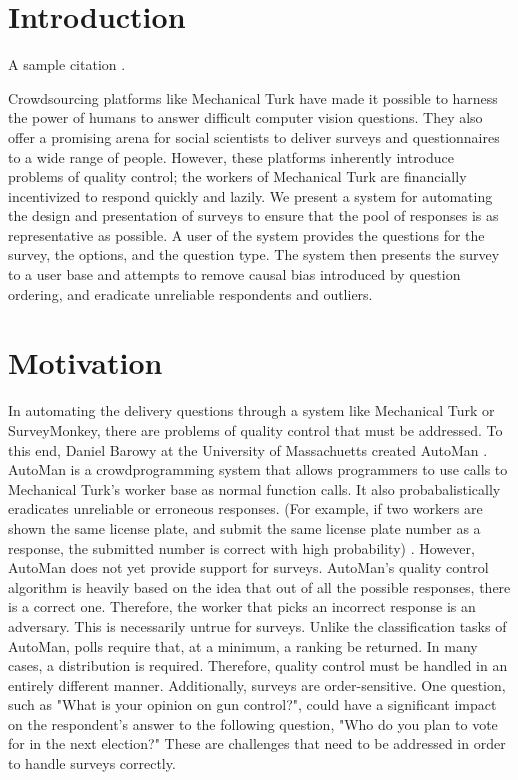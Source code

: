 \documentclass{article}
\begin{document}
\section{Introduction}
A sample citation \cite{dummyentry}.

Crowdsourcing platforms like Mechanical Turk have made it possible to harness the power of humans to answer difficult computer vision questions. They also offer a promising arena for social scientists to deliver surveys and questionnaires to a wide range of people. However, these platforms inherently introduce problems of quality control; the workers of Mechanical Turk are financially incentivized to respond quickly and lazily. We present a system for automating the design and presentation of surveys to ensure that the pool of responses is as representative as possible. A user of the system provides the questions for the survey, the options, and the question type. The system then presents the survey to a user base and attempts to remove causal bias introduced by question ordering, and eradicate unreliable respondents and outliers.
\section{Motivation}
In automating the delivery questions through a system like Mechanical Turk or SurveyMonkey, there are problems of quality control that must be addressed. To this end, Daniel Barowy at the University of Massachuetts created AutoMan \cite{automan}. AutoMan is a crowdprogramming system that allows programmers to use calls to Mechanical Turk's worker base as normal function calls. It also probabalistically eradicates unreliable or erroneous responses. (For example, if two workers are shown the same license plate, and submit the same license plate number as a response, the submitted number is correct with high probability) \cite{automan}. However, AutoMan does not yet provide support for surveys. AutoMan's quality control algorithm is heavily based on the idea that out of all the possible responses, there is a correct one. Therefore, the worker that picks an incorrect response is an adversary. This is necessarily untrue for surveys. Unlike the classification tasks of AutoMan, polls require that, at a minimum, a ranking be returned. In many cases, a distribution is required. Therefore, quality control must be handled in an entirely different manner. Additionally, surveys are order-sensitive. One question, such as "What is your opinion on gun control?", could have a significant impact on the respondent's answer to the following question, "Who do you plan to vote for in the next election?" These are challenges that need to be addressed in order to handle surveys correctly.
\end{document}
